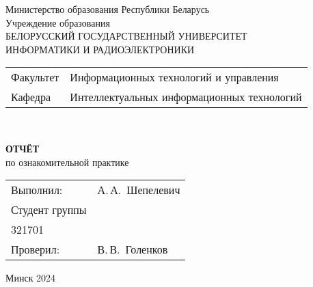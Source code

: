 \begin{titlepage}
  \begin{center}
    Министерство образования Республики Беларусь\\[1em]
    Учреждение образования\\
    БЕЛОРУССКИЙ ГОСУДАРСТВЕННЫЙ УНИВЕРСИТЕТ \\
    ИНФОРМАТИКИ И РАДИОЭЛЕКТРОНИКИ\\[1em]

    \begin{minipage}{\textwidth}
      \begin{flushleft}
        \begin{tabular}{ l l }
          Факультет & Информационных технологий и управления\\
          Кафедра   & Интеллектуальных информационных технологий
        \end{tabular}
      \end{flushleft}
    \end{minipage}\\[1em]

    \vspace{5em}


    \textbf{ОТЧЁТ}\\
    
    {по ознакомительной практике}\\
    \vspace{10em}
    
    \begin{tabular}{ p{}p{} }
      Выполнил:& А.\,А.~Шепелевич \\[1em]
      Студент группы& \\
      321701 & \\
      Проверил: & В.\,В.~Голенков \\
     
    \end{tabular}
    
    \vfill
    {\normalsize Минск 2024}
  \end{center}
\end{titlepage}
